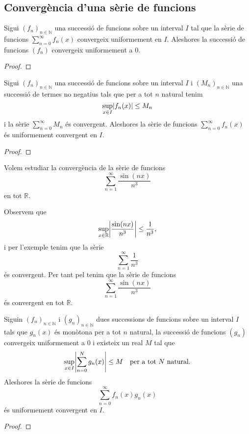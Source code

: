 \documentclass[../../Main.tex]{subfiles}
\begin{document}
	\subsection{Convergència d'una sèrie de funcions}
	\begin{proposition}
		\label{prop:si una sêrie de funcions convergeix uniformement aleshores la successió de funcions convergeix uniformement a 0}
		Sigui \((f_{n})_{n\in\mathbb{N}}\) una successió de funcions sobre un interval \(I\) tal que la sèrie de funcions \(\sum_{n=0}^{\infty}f_{n}(x)\) convergeix uniformement en \(I\). Aleshores la successió de funcions \((f_{n})\) convergeix uniformement a \(0\).
		\begin{proof}
		\end{proof}
	\end{proposition}
	\begin{theorem}
		\label{thm:criteri M de Weierstrass}
		Sigui \((f_{n})_{n\in\mathbb{N}}\) una successió de funcions sobre un interval \(I\) i \((M_{n})_{n\in\mathbb{N}}\) una successió de termes no negatius tals que per a tot \(n\) natural tenim 
		\[\sup_{x\in I}\abs{f_{n}(x)}\leq M_{n}\]
		i la sèrie \(\sum_{n=0}^{\infty}M_{n}\) és convergent. Aleshores la sèrie de funcions \(\sum_{n=0}^{\infty}f_{n}(x)\) és uniformement convergent en \(I\).
		\begin{proof}
		\end{proof}
	\end{theorem}
	\begin{example}
		Volem estudiar la convergència de la sèrie de funcions
		\[\sum_{n=1}^{\infty}\frac{\sin(nx)}{n^{3}}\]
		en tot \(\mathbb{R}\).
		\begin{solution}
			Observem que
			\[\sup_{x\in\mathbb{R}}\abs{\frac{\sin(nx)}{n^{3}}}\leq\frac{1}{n^{3}},\]
			i per l'exemple  tenim que la sèrie
			\[\sum_{n=1}^{\infty}\frac{1}{n^{3}}\]
			és convergent. Per tant pel  tenim que la sèrie de funcions
			\[\sum_{n=1}^{\infty}\frac{\sin(nx)}{n^{3}}\]
			és convergent en tot \(\mathbb{R}\).
		\end{solution}
	\end{example}
	\begin{theorem}
		\label{thm:criteri de Dirichlet}
		Siguin \((f_{n})_{n\in\mathbb{N}}\) i \((g_{n})_{n\in\mathbb{N}}\) dues successions de funcions sobre un interval \(I\) tals que \(g_{n}(x)\) és monòtona per a tot \(n\) natural, la successió de funcions \((g_{n})\) convergeix uniformement a \(0\) i existeix un real \(M\) tal que
		\[\sup_{x\in I}\abs{\sum_{n=0}^{N}g_{n}(x)}\leq M\quad\text{per a tot }N\text{ natural}.\]
		Aleshores la sèrie de funcions
		\[\sum_{n=0}^{\infty}f_{n}(x)g_{n}(x)\]
		és uniformement convergent en \(I\).
		\begin{proof}
		\end{proof}
	\end{theorem}
\end{document}
